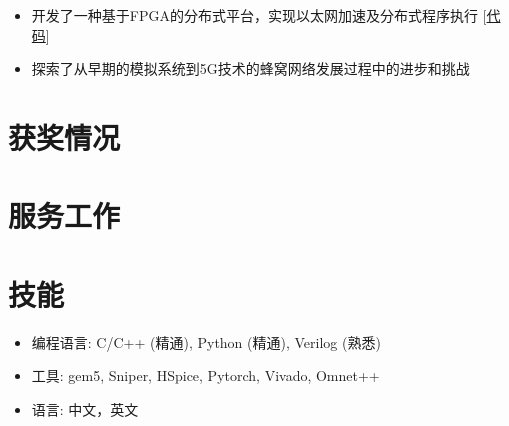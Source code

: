 \documentclass{resume}
\begin{document}
\vspace{-8pt}
\begin{itemize}
  \item 开发了一种基于FPGA的分布式平台，实现以太网加速及分布式程序执行 [\href{https://github.com/jingyao-zhang/XSC_Distributed_Platform_for_Acceleration}{代码}]
\end{itemize}

\vspace{-8pt}
\begin{itemize}
  \item 探索了从早期的模拟系统到5G技术的蜂窝网络发展过程中的进步和挑战
\end{itemize}

\section{获奖情况}

\section{服务工作}

\section{技能}
\begin{itemize}[parsep=0.5ex]
  \item 编程语言: C/C++ (精通), Python (精通), Verilog (熟悉)
  \item 工具: gem5, Sniper, HSpice, Pytorch, Vivado, Omnet++
  \item 语言: 中文，英文
\end{itemize}


%
%
\end{document}
